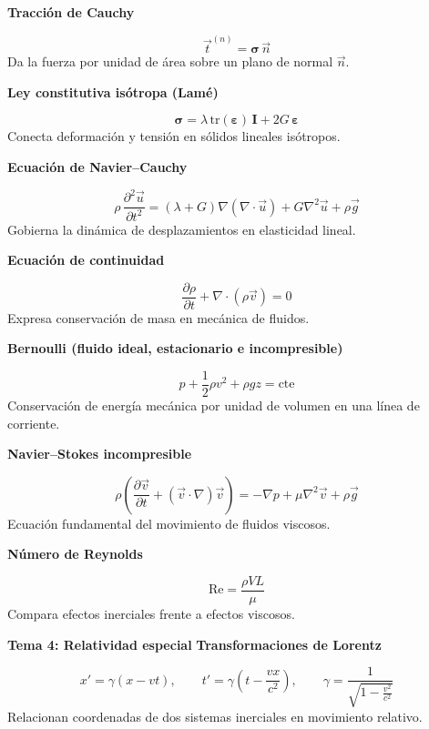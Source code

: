 \documentclass[12pt, a4paper]{article}
\theoremstyle{plain}
\theoremstyle{definition}
\theoremstyle{remark}
\newcommand{\ve}[1]{\vec{#1}}
\newcommand{\formulaname}[1]{\textbf{#1}\par\vspace{2pt}}
\begin{document}
\formulaname{Tracción de Cauchy}
\begin{equation}
  \ve{t}^{(n)}=\boldsymbol{\sigma}\,\ve{n}
\end{equation}
Da la fuerza por unidad de área sobre un plano de normal $\ve{n}$.

\formulaname{Ley constitutiva isótropa (Lamé)}
\begin{equation}
  \boldsymbol{\sigma}=\lambda\,\mathrm{tr}(\boldsymbol{\varepsilon})\,\mathbf{I}
  +2G\,\boldsymbol{\varepsilon}
\end{equation}
Conecta deformación y tensión en sólidos lineales isótropos.

\formulaname{Ecuación de Navier--Cauchy}
\begin{equation}
  \rho\,\frac{\partial^2\ve{u}}{\partial t^2}
  =(\lambda+G)\nabla(\nabla\cdot\ve{u})+G\nabla^2\ve{u}+\rho\ve{g}
\end{equation}
Gobierna la dinámica de desplazamientos en elasticidad lineal.

\formulaname{Ecuación de continuidad}
\begin{equation}
  \frac{\partial \rho}{\partial t}+\nabla\cdot(\rho\ve{v})=0
\end{equation}
Expresa conservación de masa en mecánica de fluidos.

\formulaname{Bernoulli (fluido ideal, estacionario e incompresible)}
\begin{equation}
  p+\frac{1}{2}\rho v^2+\rho gz=\text{cte}
\end{equation}
Conservación de energía mecánica por unidad de volumen en una línea de corriente.

\formulaname{Navier--Stokes incompresible}
\begin{equation}
  \rho\left(\frac{\partial \ve{v}}{\partial t}+(\ve{v}\cdot\nabla)\ve{v}\right)
  =-\nabla p+\mu\nabla^2\ve{v}+\rho\ve{g}
\end{equation}
Ecuación fundamental del movimiento de fluidos viscosos.

\formulaname{Número de Reynolds}
\begin{equation}
  \mathrm{Re}=\frac{\rho V L}{\mu}
\end{equation}
Compara efectos inerciales frente a efectos viscosos.

\textbf{Tema 4: Relatividad especial}
\formulaname{Transformaciones de Lorentz}
\begin{equation}
  x'=\gamma(x-vt),\qquad
  t'=\gamma\left(t-\frac{vx}{c^2}\right),\qquad
  \gamma=\frac{1}{\sqrt{1-\frac{v^2}{c^2}}}
\end{equation}
Relacionan coordenadas de dos sistemas inerciales en movimiento relativo.
\end{document}
